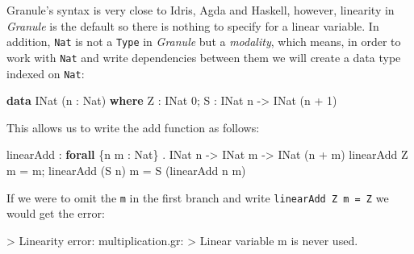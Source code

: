 \documentclass[
]{article}
\newenvironment{Shaded}{}{}
\newcommand{\DataTypeTok}[1]{\textcolor[rgb]{0.56,0.13,0.00}{#1}}
\newcommand{\DecValTok}[1]{\textcolor[rgb]{0.25,0.63,0.44}{#1}}
\newcommand{\FunctionTok}[1]{\textcolor[rgb]{0.02,0.16,0.49}{#1}}
\newcommand{\KeywordTok}[1]{\textcolor[rgb]{0.00,0.44,0.13}{\textbf{#1}}}
\newcommand{\NormalTok}[1]{#1}
\newcommand{\OperatorTok}[1]{\textcolor[rgb]{0.40,0.40,0.40}{#1}}
\newcommand{\OtherTok}[1]{\textcolor[rgb]{0.00,0.44,0.13}{#1}}
\begin{document}
Granule's syntax is very close to Idris, Agda and Haskell, however,
linearity in \emph{Granule} is the default so there is nothing to
specify for a linear variable. In addition, \texttt{Nat} is not a
\texttt{Type} in \emph{Granule} but a \emph{modality}, which means, in
order to work with \texttt{Nat} and write dependencies between them we
will create a data type indexed on \texttt{Nat}:

\begin{Shaded}
\begin{Highlighting}[]
\KeywordTok{data} \DataTypeTok{INat}\NormalTok{ (n }\OperatorTok{:} \DataTypeTok{Nat}\NormalTok{) }\KeywordTok{where}
  \DataTypeTok{Z} \OperatorTok{:} \DataTypeTok{INat} \DecValTok{0}\NormalTok{;}
  \DataTypeTok{S} \OperatorTok{:} \DataTypeTok{INat}\NormalTok{ n }\OtherTok{{-}\textgreater{}} \DataTypeTok{INat}\NormalTok{ (n }\OperatorTok{+} \DecValTok{1}\NormalTok{)}
\end{Highlighting}
\end{Shaded}

This allows us to write the add function as follows:

\begin{Shaded}
\begin{Highlighting}[]
\NormalTok{linearAdd }\OperatorTok{:} \KeywordTok{forall}\NormalTok{ \{n m }\OperatorTok{:} \DataTypeTok{Nat}\NormalTok{\} }\OperatorTok{.} \DataTypeTok{INat}\NormalTok{ n }\OtherTok{{-}\textgreater{}} \DataTypeTok{INat}\NormalTok{ m }\OtherTok{{-}\textgreater{}} \DataTypeTok{INat}\NormalTok{ (n }\OperatorTok{+}\NormalTok{ m)}
\NormalTok{linearAdd }\DataTypeTok{Z}\NormalTok{ m }\OtherTok{=}\NormalTok{ m;}
\NormalTok{linearAdd (}\DataTypeTok{S}\NormalTok{ n) m }\OtherTok{=} \DataTypeTok{S}\NormalTok{ (linearAdd n m)}
\end{Highlighting}
\end{Shaded}

If we were to omit the \texttt{m} in the first branch and write
\texttt{linearAdd\ Z\ m\ =\ Z} we would get the error:

\begin{Shaded}
\begin{Highlighting}[]
\OperatorTok{\textgreater{}} \DataTypeTok{Linearity} \FunctionTok{error}\OperatorTok{:}\NormalTok{ multiplication}\OperatorTok{.}\NormalTok{gr}\OperatorTok{:}
\OperatorTok{\textgreater{}} \DataTypeTok{Linear}\NormalTok{ variable }\OtherTok{\textasciigrave{}m\textasciigrave{}}\NormalTok{ is never used}\OperatorTok{.}
\end{Highlighting}
\end{Shaded}
\end{document}
